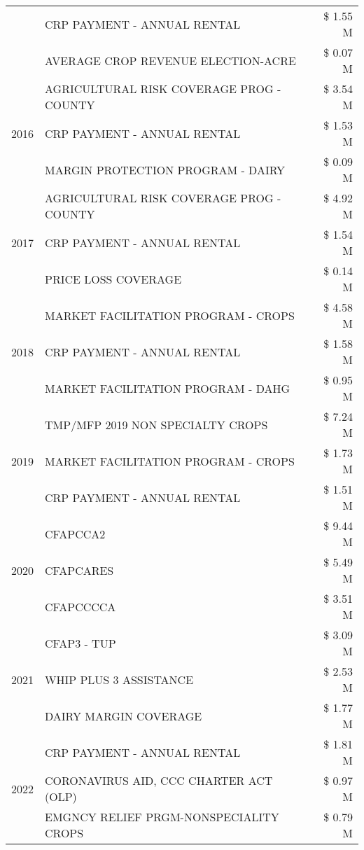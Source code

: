 \begin{tabular}{llr}
 & CRP PAYMENT - ANNUAL RENTAL & \$ 1.55 M \\
 & AVERAGE CROP REVENUE ELECTION-ACRE & \$ 0.07 M \\
\cline{1-3}
\multirow[t]{3}{*}{2016} & AGRICULTURAL RISK COVERAGE PROG - COUNTY & \$ 3.54 M \\
 & CRP PAYMENT - ANNUAL RENTAL & \$ 1.53 M \\
 & MARGIN PROTECTION PROGRAM - DAIRY & \$ 0.09 M \\
\cline{1-3}
\multirow[t]{3}{*}{2017} & AGRICULTURAL RISK COVERAGE PROG - COUNTY & \$ 4.92 M \\
 & CRP PAYMENT - ANNUAL RENTAL & \$ 1.54 M \\
 & PRICE LOSS COVERAGE & \$ 0.14 M \\
\cline{1-3}
\multirow[t]{3}{*}{2018} & MARKET FACILITATION PROGRAM - CROPS & \$ 4.58 M \\
 & CRP PAYMENT - ANNUAL RENTAL & \$ 1.58 M \\
 & MARKET FACILITATION PROGRAM - DAHG & \$ 0.95 M \\
\cline{1-3}
\multirow[t]{3}{*}{2019} & TMP/MFP 2019 NON SPECIALTY CROPS & \$ 7.24 M \\
 & MARKET FACILITATION PROGRAM - CROPS & \$ 1.73 M \\
 & CRP PAYMENT - ANNUAL RENTAL & \$ 1.51 M \\
\cline{1-3}
\multirow[t]{3}{*}{2020} & CFAPCCA2 & \$ 9.44 M \\
 & CFAPCARES & \$ 5.49 M \\
 & CFAPCCCCA & \$ 3.51 M \\
\cline{1-3}
\multirow[t]{3}{*}{2021} & CFAP3 - TUP & \$ 3.09 M \\
 & WHIP PLUS 3 ASSISTANCE & \$ 2.53 M \\
 & DAIRY MARGIN COVERAGE & \$ 1.77 M \\
\cline{1-3}
\multirow[t]{3}{*}{2022} & CRP PAYMENT - ANNUAL RENTAL & \$ 1.81 M \\
 & CORONAVIRUS AID, CCC CHARTER ACT (OLP) & \$ 0.97 M \\
 & EMGNCY RELIEF PRGM-NONSPECIALITY CROPS & \$ 0.79 M \\
\cline{1-3}
\bottomrule
\end{tabular}
